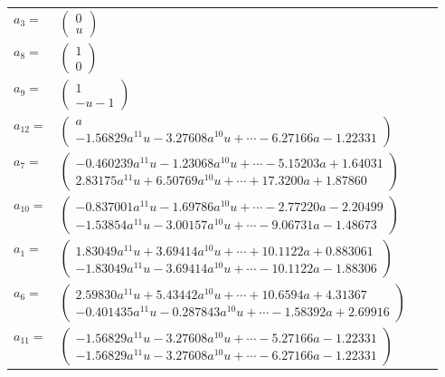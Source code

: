 \documentclass[1p]{elsarticle_modified}
\theoremstyle{definition}
\begin{document}
\begin{tabular}{m{7pt} m{180pt} m{7pt} m{180pt} }
\flushright $a_{3}=$&$\begin{pmatrix}0\\u\end{pmatrix}$ \\
\flushright $a_{8}=$&$\begin{pmatrix}1\\0\end{pmatrix}$ \\
\flushright $a_{9}=$&$\begin{pmatrix}1\\- u-1\end{pmatrix}$ \\
\flushright $a_{12}=$&$\begin{pmatrix}a\\-1.56829 a^{11} u-3.27608 a^{10} u+\cdots-6.27166 a-1.22331\end{pmatrix}$ \\
\flushright $a_{7}=$&$\begin{pmatrix}-0.460239 a^{11} u-1.23068 a^{10} u+\cdots-5.15203 a+1.64031\\2.83175 a^{11} u+6.50769 a^{10} u+\cdots+17.3200 a+1.87860\end{pmatrix}$ \\
\flushright $a_{10}=$&$\begin{pmatrix}-0.837001 a^{11} u-1.69786 a^{10} u+\cdots-2.77220 a-2.20499\\-1.53854 a^{11} u-3.00157 a^{10} u+\cdots-9.06731 a-1.48673\end{pmatrix}$ \\
\flushright $a_{1}=$&$\begin{pmatrix}1.83049 a^{11} u+3.69414 a^{10} u+\cdots+10.1122 a+0.883061\\-1.83049 a^{11} u-3.69414 a^{10} u+\cdots-10.1122 a-1.88306\end{pmatrix}$ \\
\flushright $a_{6}=$&$\begin{pmatrix}2.59830 a^{11} u+5.43442 a^{10} u+\cdots+10.6594 a+4.31367\\-0.401435 a^{11} u-0.287843 a^{10} u+\cdots-1.58392 a+2.69916\end{pmatrix}$ \\
\flushright $a_{11}=$&$\begin{pmatrix}-1.56829 a^{11} u-3.27608 a^{10} u+\cdots-5.27166 a-1.22331\\-1.56829 a^{11} u-3.27608 a^{10} u+\cdots-6.27166 a-1.22331\end{pmatrix}$ \\

\end{tabular}
\end{document}
